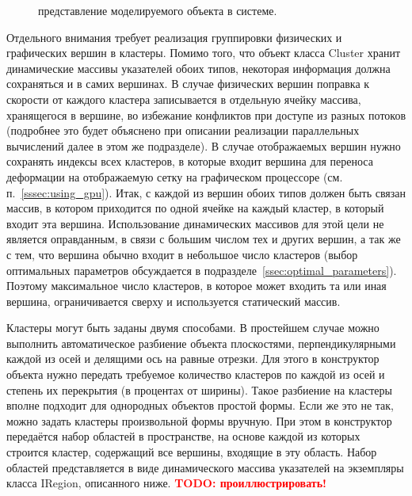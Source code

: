 \documentclass[a4paper, 14pt, titlepage]{extarticle}
\newcommand{\todo}[1]{\textbf{\textcolor{red}{TODO: #1}}}
\newcommand{\includefigure}[3][]{
    \begin{figure}[!htb]
      \center{\texttt{[image: \#2]}}
      \caption{#3} \label{fig:#2}
    \end{figure}
  }
\begin{document}
        \includefigure{core-vertices}{представление моделируемого объекта в системе.}

        Отдельного внимания требует реализация группировки физических и графических вершин в
        кластеры. Помимо того, что объект класса Cluster хранит динамические массивы указателей
        обоих типов, некоторая информация должна сохраняться и в самих вершинах. В случае физических
        вершин поправка к скорости от каждого кластера записывается в отдельную ячейку массива,
        хранящегося в вершине, во избежание конфликтов при доступе из разных потоков (подробнее это
        будет объяснено при описании реализации параллельных вычислений далее в этом же подразделе).
        В случае отображаемых вершин нужно сохранять индексы всех кластеров, в которые входит
        вершина для переноса деформации на отображаемую сетку на графическом процессоре (см.
        п.~\ref{sssec:using_gpu}). Итак, с каждой из вершин обоих типов должен быть связан массив, в
        котором приходится по одной ячейке на каждый кластер, в который входит эта вершина.
        Использование динамических массивов для этой цели не является оправданным, в связи с большим
        числом тех и других вершин, а так же с тем, что вершина обычно входит в небольшое число
        кластеров (выбор оптимальных параметров обсуждается в подразделе~\ref{ssec:optimal_parameters}). Поэтому
        максимальное число кластеров, в которое может входить та или иная вершина, ограничивается
        сверху и используется статический массив.

        Кластеры могут быть заданы двумя способами. В простейшем случае можно выполнить автоматическое
        разбиение объекта плоскостями, перпендикулярными каждой из осей и делящими ось на равные
        отрезки. Для этого в конструктор объекта нужно передать требуемое количество кластеров по
        каждой из осей и степень их перекрытия (в процентах от ширины). Такое разбиение на кластеры
        вполне подходит для однородных объектов простой формы. Если же это не так, можно задать
        кластеры произвольной формы вручную. При этом в конструктор передаётся набор областей в
        пространстве, на основе каждой из которых строится кластер, содержащий все вершины, входящие
        в эту область. Набор областей представляется в виде динамического массива указателей на
        экземпляры класса IRegion, описанного ниже.
        \todo{проиллюстрировать!}
\end{document}
